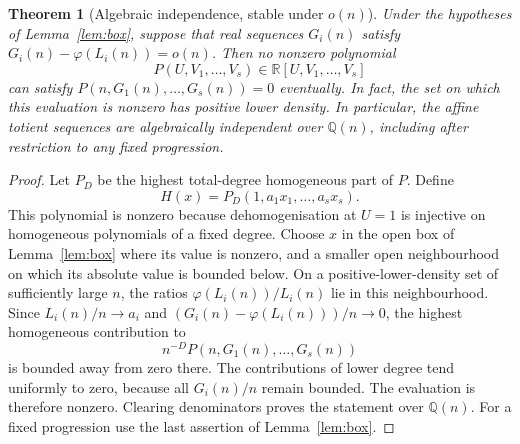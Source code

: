 \documentclass[11pt,a4paper]{article}
\newtheorem{theorem}{Theorem}[section]
\theoremstyle{definition}\newtheorem{definition}[theorem]{Definition}
\theoremstyle{remark}\newtheorem{remark}[theorem]{Remark}
\newcommand{\Q}{\mathbb Q}\newcommand{\R}{\mathbb R}\newcommand{\Z}{\mathbb Z}\newcommand{\N}{\mathbb N}
\newcommand{\ph}{\varphi}\newcommand{\rad}{\operatorname{rad}}
\begin{document}
\begin{theorem}[Algebraic independence, stable under $o(n)$]\label{thm:stable}
Under the hypotheses of Lemma~\ref{lem:box}, suppose that real sequences $G_i(n)$
satisfy $G_i(n)-\ph(L_i(n))=o(n)$. Then no nonzero polynomial
\[
 P(U,V_1,\ldots,V_s)\in\R[U,V_1,\ldots,V_s]
\]
can satisfy $P(n,G_1(n),\ldots,G_s(n))=0$ eventually.
In fact, the set on which this evaluation is nonzero has positive lower density.
In particular, the affine totient sequences are algebraically independent over
$\Q(n)$, including after restriction to any fixed progression.
\end{theorem}
\begin{proof}
Let $P_D$ be the highest total-degree homogeneous part of $P$. Define
\[ H(x)=P_D(1,a_1x_1,\ldots,a_sx_s). \]
This polynomial is nonzero because dehomogenisation at $U=1$ is injective
on homogeneous polynomials of a fixed degree.
Choose $x$ in the open box of Lemma~\ref{lem:box} where its value is nonzero,
and a smaller open neighbourhood on which its absolute value is bounded below.
On a positive-lower-density set of sufficiently large $n$, the ratios
$\ph(L_i(n))/L_i(n)$ lie in this neighbourhood.
Since $L_i(n)/n\to a_i$ and $(G_i(n)-\ph(L_i(n)))/n\to0$,
the highest homogeneous contribution to
\[ n^{-D}P(n,G_1(n),\ldots,G_s(n)) \]
is bounded away from zero there. The contributions of lower degree tend uniformly
to zero, because all $G_i(n)/n$ remain bounded. The evaluation is therefore nonzero.
Clearing denominators proves the statement over $\Q(n)$.
For a fixed progression use the last assertion of Lemma~\ref{lem:box}.
\end{proof}
\end{document}
